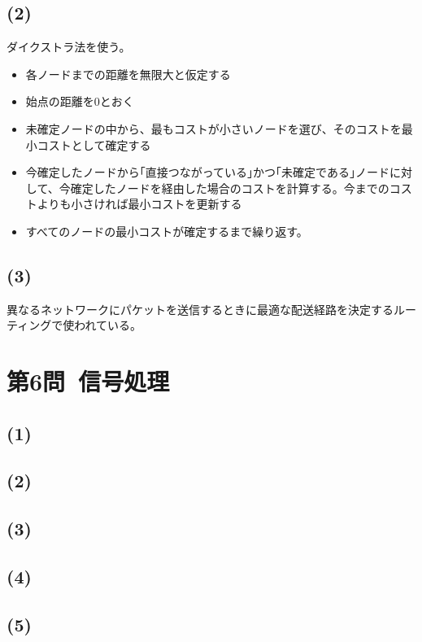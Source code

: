 \documentclass[a4paper,12pt,xelatex,ja=standard]{bxjsarticle}
\begin{document}
\subsection*{(2)}
ダイクストラ法を使う。
\begin{itemize}
  \item 各ノードまでの距離を無限大と仮定する
  \item 始点の距離を0とおく
  \item 未確定ノードの中から、最もコストが小さいノードを選び、そのコストを最小コストとして確定する
  \item 今確定したノードから｢直接つながっている｣かつ｢未確定である｣ノードに対して、今確定したノードを経由した場合のコストを計算する。今までのコストよりも小さければ最小コストを更新する
  \item すべてのノードの最小コストが確定するまで繰り返す。
\end{itemize}

\subsection*{(3)}
異なるネットワークにパケットを送信するときに最適な配送経路を決定するルーティングで使われている。

\section*{第6問\ 信号処理}
\subsection*{(1)}

\subsection*{(2)}

\subsection*{(3)}

\subsection*{(4)}

\subsection*{(5)}
\end{document}

